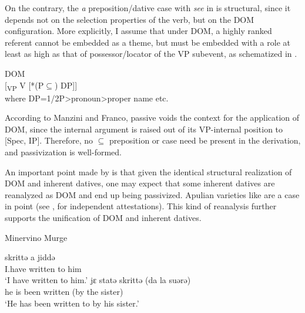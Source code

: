 \documentclass[output=paper]{langscibook}
\begin{document}
On the contrary, the \textit{a} preposition/dative case with \textit{see} in  is structural, since it depends not on the selection properties of the verb, but on the DOM configuration. More explicitly, I assume that under DOM, a highly ranked referent cannot be embedded as a theme, but must be embedded with a role at least as high as that of possessor/locator of the VP subevent, as schematized in .

\ea\label{ex:manzini:}
DOM\\{}
[\textsubscript{VP} V   [*(P${\subseteq}$) DP]]\\
where DP=1/2P>pronoun>proper name etc.
\z

According to Manzini and Franco, passive voids the context for the application of DOM, since the internal argument is raised out of its VP-internal position to [Spec, IP]. Therefore, no ${\subseteq}$ preposition or case need be present in the derivation, and passivization is well-formed.  

An important point made by \citet{Pineda2016} is that given the identical structural realization of DOM and inherent datives, one may expect that some inherent datives are reanalyzed as DOM and end up being passivized. Apulian varieties like  are a case in point (see \citealt{Loporcaro1988}, \citealt{Ledgeway2000} for independent attestations). This kind of reanalysis further supports the unification of DOM and inherent datives.  

\ea\label{ex:manzini:}
{Minervino Murge}\\
\begin{xlist}
\ex {}   {skrittə}   {a} {jiddə}\\
I.have  written  to him\\
\glt ‘I have written to him.’
\ex {}   {jɛ}   {statə}   {skrittə}   (da la suərə)\\
he  is  been   written (by the sister)\\
\glt ‘He has been written to by his sister.’
\end{xlist}
\z
\end{document}
